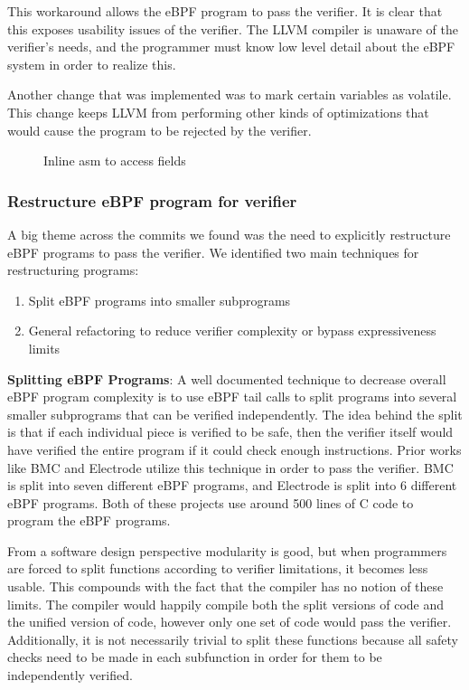 This workaround allows the eBPF program to pass the verifier.
It is clear that this exposes usability issues of the verifier.
The LLVM compiler is unaware of the verifier's needs, and the programmer must know low level detail about the eBPF system in order to realize this.

Another change that was implemented was to mark certain variables as volatile.
This change keeps LLVM from performing other kinds of optimizations that would cause the program to be rejected by the verifier.

\begin{figure}
    
    \caption{Inline asm to access fields}
    \label{fig:inline-asm}
\end{figure}

\subsubsection{Restructure eBPF program for verifier}
A big theme across the commits we found was the need to explicitly restructure eBPF programs to pass the verifier.
We identified two main techniques for restructuring programs:

\begin{enumerate}
    \item Split eBPF programs into smaller subprograms
    \item General refactoring to reduce verifier complexity or bypass expressiveness limits
\end{enumerate}

\textbf{Splitting eBPF Programs}:
A well documented technique to decrease overall eBPF program complexity is to use eBPF tail calls to split programs into several smaller subprograms that can be verified independently.
The idea behind the split is that if each individual piece is verified to be safe, then the verifier itself would have verified the entire program if it could check enough instructions.
Prior works like BMC\cite{BMC} and Electrode\cite{Electrode} utilize this technique in order to pass the verifier.
BMC is split into seven different eBPF programs, and Electrode is split into 6 different eBPF programs.
Both of these projects use around 500 lines of C code to program the eBPF programs.

From a software design perspective modularity is good, but when programmers are forced to split functions according to verifier limitations, it becomes less usable.
This compounds with the fact that the compiler has no notion of these limits.
The compiler would happily compile both the split versions of code and the unified version of code, however only one set of code would pass the verifier.
Additionally, it is not necessarily trivial to split these functions because all safety checks need to be made in each subfunction in order for them to be independently verified.

